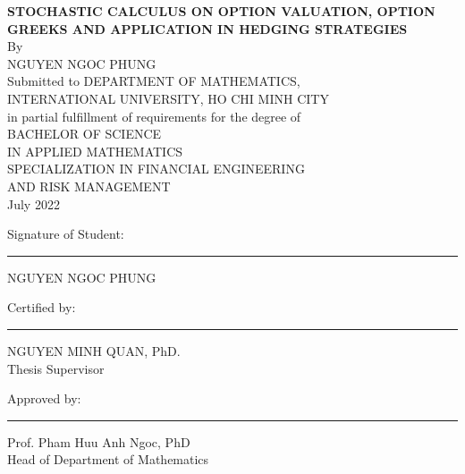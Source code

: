 \documentclass[12pt,a4paper,oneside]{book}
\begin{document}
\begin{titlepage}
		\newpage
		\thispagestyle{empty}	
		\begin{center}
			\large\textbf{STOCHASTIC CALCULUS ON OPTION VALUATION, OPTION GREEKS AND APPLICATION IN HEDGING STRATEGIES} \\
			\normalsize{By}\\
			\large{NGUYEN NGOC PHUNG}\\
			\vskip10mm
			\normalsize{Submitted to DEPARTMENT OF MATHEMATICS,\\INTERNATIONAL UNIVERSITY, HO CHI MINH CITY\\ in partial fulfillment of requirements for the degree of\\
				BACHELOR OF SCIENCE \\ 
				IN APPLIED MATHEMATICS \\
				SPECIALIZATION IN FINANCIAL ENGINEERING  \\ 
				AND RISK MANAGEMENT}\\
			July 2022
			\vskip30mm
		\end{center}
		Signature of Student:
		\rule[0em]{26.7em}{0.5pt}
		\begin{flushright}NGUYEN NGOC PHUNG \end{flushright}
		\vskip10mm
		Certified by:
		\rule[0em]{30em}{0.5pt}
		\begin{flushright}NGUYEN MINH QUAN, PhD.\\ Thesis Supervisor 
		\end{flushright}
		\vskip10mm
		Approved by:
		\rule[0em]{30em}{0.5pt}
        \begin{flushright}Prof. Pham Huu Anh Ngoc, PhD\\ Head of Department of Mathematics
        \end{flushright}
	\end{titlepage}
		
\end{document}
